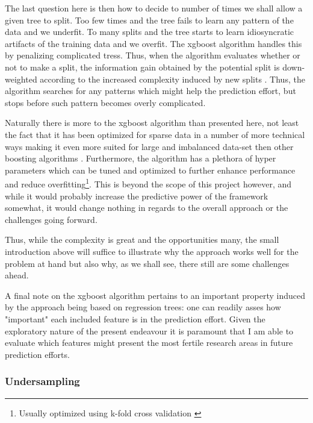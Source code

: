 \documentclass[a4paper]{article}
\begin{document}
The last question here is then how to decide to number of times we shall allow a given tree to split. Too few times and the tree fails to learn any pattern of the data and we underfit. To many splits and the tree starts to learn idiosyncratic artifacts of the training data and we overfit. The xgboost algorithm handles this by penalizing complicated tress. Thus, when the algorithm evaluates whether or not to make a split, the information gain obtained by the potential split is down-weighted according to the increased complexity induced by new splits \cite[4-7]{Chen_2016}. Thus, the algorithm searches for any patterns which might help the prediction effort, but stops before such pattern becomes overly complicated.\par 

Naturally there is more to the xgboost algorithm than presented here, not least the fact that it has been optimized for sparse data in a number of more technical ways making it even more suited for large and imbalanced data-set then other boosting algorithms \cite[5]{Chen_2016}. Furthermore, the algorithm has a plethora of hyper parameters which can be tuned and optimized to further enhance performance and reduce overfitting\footnote{Usually optimized using k-fold cross validation \citep[241-249]{Friedman_2001}}. This is beyond the scope of this project however, and while it would probably increase the predictive power of the framework somewhat, it would change nothing in regards to the overall approach or the challenges going forward.\par 

Thus, while the complexity is great and the opportunities many, the small introduction above will suffice to illustrate why the approach works well for the problem at hand but also why, as we shall see, there still are some challenges ahead.\par

A final note on the xgboost algorithm pertains to an important property induced by the approach being based on regression trees: one can readily asses how "important" each included feature is in the prediction effort. Given the exploratory nature of the present endeavour it is paramount that I am able to evaluate which features might present the most fertile research areas in future prediction efforts.\par

\subsubsection{Undersampling}
\end{document}
